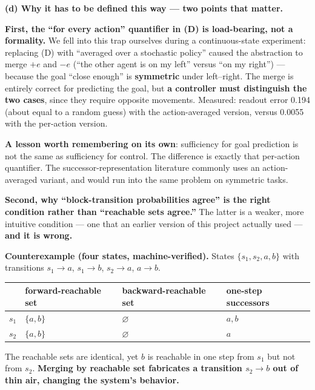 \documentclass[11pt]{article}
\renewenvironment{quote}
  {\def\FrameCommand{{\color{gray!60}\vrule width 2pt}\hspace{8pt}}%
   \MakeFramed{\advance\hsize-\width \FrameRestore}\begin{itshape}}
  {\end{itshape}\endMakeFramed}
\begin{document}
\textbf{(d) Why it has to be defined this way --- two points that matter.}

\textbf{First, the ``for every action'' quantifier in (D) is load-bearing, not a formality.} We fell into this trap ourselves during a continuous-state experiment: replacing (D) with ``averaged over a stochastic policy'' caused the abstraction to merge \(+e\) and \(-e\) (``the other agent is on my left'' versus ``on my right'') --- because the goal ``close enough'' is \textbf{symmetric} under left--right. The merge is entirely correct for predicting the goal, but \textbf{a controller must distinguish the two cases}, since they require opposite movements. Measured: readout error 0.194 (about equal to a random guess) with the action-averaged version, versus 0.0055 with the per-action version.

\begin{quote}
\textbf{A lesson worth remembering on its own}: sufficiency for goal prediction is not the same as sufficiency for control. The difference is exactly that per-action quantifier. The successor-representation literature commonly uses an action-averaged variant, and would run into the same problem on symmetric tasks.
\end{quote}

\textbf{Second, why ``block-transition probabilities agree'' is the right condition rather than ``reachable sets agree.''} The latter is a weaker, more intuitive condition --- one that an earlier version of this project actually used --- \textbf{and it is wrong.}

\begin{quote}
\textbf{Counterexample (four states, machine-verified).} States \(\{s_1,s_2,a,b\}\) with transitions \(s_1\to a\), \(s_1\to b\), \(s_2\to a\), \(a\to b\).

\begin{longtable}[]{@{}llll@{}}
\toprule
& forward-reachable set & backward-reachable set & one-step successors\tabularnewline
\midrule
\endhead
\(s_1\) & \(\{a,b\}\) & \(\varnothing\) & \(a,b\)\tabularnewline
\(s_2\) & \(\{a,b\}\) & \(\varnothing\) & \(a\)\tabularnewline
\bottomrule
\end{longtable}

The reachable sets are identical, yet \(b\) is reachable in one step from \(s_1\) but not from \(s_2\). \textbf{Merging by reachable set fabricates a transition \(s_2\to b\) out of thin air, changing the system's behavior.}
\end{quote}
\end{document}
